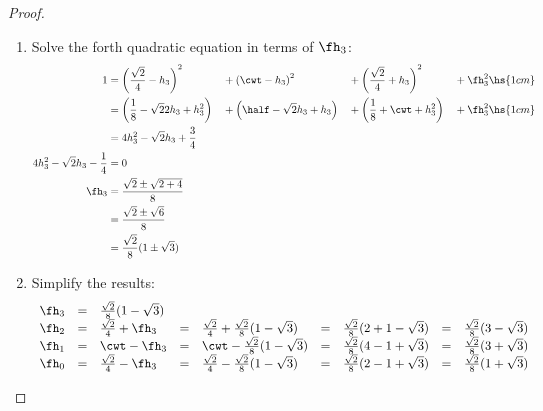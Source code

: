 \begin{proof}
\begin{enumerate}
\item Solve the forth quadratic equation in terms of $\fh_3$:
\begin{align*}
  1
    &=  \left(\frac{\sqrt{2}}{4}-h_3\right)^2
    &&+ \left(\cwt-h_3\right)^2
    &&+ \left(\frac{\sqrt{2}}{4}+h_3\right)^2
    &&+\fh_3^2 \hs{1cm}
  \\&=  \left(\frac{1}{8}-\sqrt{2}{2}h_3+h_3^2\right)
    &&+ \left(\half -\sqrt{2}h_3+h_3\right)
    &&+ \left(\frac{1}{8}+\cwt+h_3^2\right)
    &&+\fh_3^2 \hs{1cm}
  \\&=  4h_3^2 -\sqrt{2}h_3 + \frac{3}{4}
\\
  4h_3^2 -\sqrt{2}h_3 - \frac{1}{4} &=0
\\
 \fh_3
    &= \frac{\sqrt{2}\pm\sqrt{2+4}}{8}
  \\&= \frac{\sqrt{2}\pm\sqrt{6}}{8}
  \\&= \frac{\sqrt{2}}{8}(1\pm\sqrt{3})
\end{align*}

\item Simplify the results:
\[\begin{array}{r*{4}{cl}}
 \fh_3 &=& \frac{\sqrt{2}}{8}(1-\sqrt{3})
\\
 \fh_2 &=& \frac{\sqrt{2}}{4} +\fh_3
      &=& \frac{\sqrt{2}}{4} + \frac{\sqrt{2}}{8}(1-\sqrt{3})
      &=& \frac{\sqrt{2}}{8}(2+1-\sqrt{3})
      &=& \frac{\sqrt{2}}{8}(3-\sqrt{3})
\\
 \fh_1 &=& \cwt -\fh_3
      &=& \cwt - \frac{\sqrt{2}}{8}(1-\sqrt{3})
      &=& \frac{\sqrt{2}}{8}(4-1+\sqrt{3})
      &=& \frac{\sqrt{2}}{8}(3+\sqrt{3})
\\
 \fh_0 &=& \frac{\sqrt{2}}{4} -\fh_3
      &=& \frac{\sqrt{2}}{4} - \frac{\sqrt{2}}{8}(1-\sqrt{3})
      &=& \frac{\sqrt{2}}{8}(2-1+\sqrt{3})
      &=& \frac{\sqrt{2}}{8}(1+\sqrt{3})
\end{array}\]


\end{enumerate}
\end{proof}
